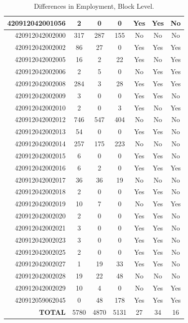 \documentclass[paper = letter, fontsize = 11pt]{scrartcl}
\begin{document}
\begin{table}
\begin{center}
\begin{tabular}{ r | c c c c c c }
			\hline 
			420912042001056 & 2 & 0 & 0 & Yes & Yes & No \\
			\hline 
			420912042002000 & 317 & 287 & 155 & No & No & No \\
			\hline 
			420912042002002 & 86 & 27 & 0 & Yes & Yes & Yes \\
			\hline 
			420912042002005 & 16 & 2 & 22 & Yes & No & Yes \\
			\hline 
			420912042002006 & 2 & 5 & 0 & No & Yes & Yes \\
			\hline 
			420912042002008 & 284 & 3 & 28 & Yes & Yes & Yes \\
			\hline 
			420912042002009 & 3 & 0 & 0 & Yes & Yes & No \\
			\hline 
			420912042002010 & 2 & 0 & 3 & Yes & No & Yes \\
			\hline 
			420912042002012 & 746 & 547 & 404 & No & No & No \\
			\hline 
			420912042002013 & 54 & 0 & 0 & Yes & Yes & No \\
			\hline 
			420912042002014 & 257 & 175 & 223 & No & No & No \\
			\hline 
			420912042002015 & 6 & 0 & 0 & Yes & Yes & No \\
			\hline 
			420912042002016 & 6 & 2 & 0 & Yes & Yes & Yes \\
			\hline 
			420912042002017 & 36 & 36 & 19 & No & No & No \\
			\hline 
			420912042002018 & 2 & 0 & 0 & Yes & Yes & No \\
			\hline 
			420912042002019 & 10 & 7 & 0 & No & Yes & Yes \\
			\hline 
			420912042002020 & 2 & 0 & 0 & Yes & Yes & No \\
			\hline 
			420912042002021 & 3 & 0 & 0 & Yes & Yes & No \\
			\hline 
			420912042002023 & 3 & 0 & 0 & Yes & Yes & No \\
			\hline 
			420912042002025 & 2 & 0 & 0 & Yes & Yes & No \\
			\hline 
			420912042002027 & 1 & 19 & 33 & Yes & Yes & No \\
			\hline 
			420912042002028 & 19 & 22 & 48 & No & No & No \\
			\hline 
			420912042002029 & 10 & 4 & 0 & No & Yes & Yes \\
			\hline 
			420912059062045 & 0 & 48 & 178 & Yes & Yes & Yes \\
			\hline
			\hline
			\textbf{TOTAL} & 5780 & 4870 & 5131 & 27 & 34 & 16 \\
			\hline
		\end{tabular}
	\end{center}
	\caption{Differences in Employment, Block Level.}
\end{table}
\end{document}
